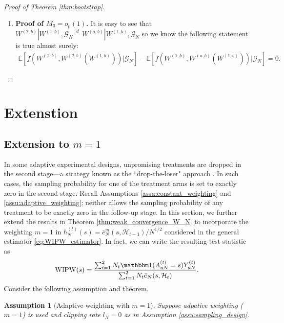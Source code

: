 \documentclass[12pt]{article}
\newtheorem{assumption}{Assumption}
\newcommand{\E}{\mathbb E}								%
\newcommand{\indicator}{\mathbbm 1}						%
\newcommand{\WIPW}{\mathrm{WIPW}}
\begin{document}
\begin{proof}[Proof of Theorem \ref{thm:bootstrap}]
\begin{enumerate}
		\item \textbf{Proof of $M_3=o_p(1)$.} It is easy to see that $W^{(2,b)}|W^{(1,b)},\mathcal{G}_N\overset{d}{=}W^{(a,b)}|W^{(1,b)},\mathcal{G}_N$ so we know the following statement is true almost surely:
		\begin{align*}
			\E[f(W^{(1,b)},W^{(2,b)}(W^{(1,b)}))|\mathcal{G}_N]-\E[f(W^{(1,b)},W^{(a,b)}(W^{(1,b)}))|\mathcal{G}_N]=0.
		\end{align*}
	\end{enumerate}
	

\end{proof}



\section{Extenstion}\label{sec:extension}
  

\subsection{Extension to $m=1$}\label{sec:extension_m_1}


In some adaptive experimental designs, unpromising treatments are dropped in the second stage—a strategy known as the ``drop-the-loser" approach \citep{sampson2005drop,sill2009drop}. In such cases, the sampling probability for one of the treatment arms is set to exactly zero in the second stage. 
Recall Assumptions \ref{assu:constant_weighting} and \ref{assu:adaptive_weighting}; neither allows the sampling probability of any treatment to be exactly zero in the follow-up stage. In this section, we further extend the results in Theorem \ref{thm:weak_convergence_W_N} to incorporate the weighting $m=1$ in $h_{N}^{(t)}(s)=\bar e_N^{m}(s,\mathcal{H}_{t-1})/N^{1/2}$ considered in the general estimator \eqref{eq:WIPW_estimator}. In fact, we can write the resulting test statistic as
\begin{align}\label{eq:WIPW_m_1}
	\WIPW(s)=\frac{\sum_{t=1}^2 N_t \indicator(A_{uN}^{(t)}=s)Y_{uN}^{(t)}}{\sum_{t=1}^2N_t\bar e_N(s,\mathcal{H}_t)}.
\end{align}
Consider the following assumption and theorem.

\begin{assumption}[Adaptive weighting with $m=1$]\label{assu:adaptive_weighting_m_1}
	Suppose adpative weighting ($m=1$) is used and clipping rate $l_N=0$ as in Assumption \ref{assu:sampling_design}.
\end{assumption}
\end{document}
